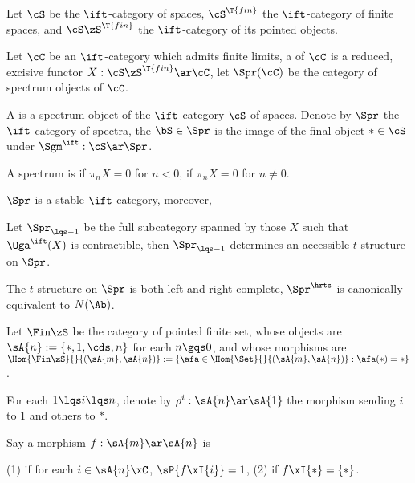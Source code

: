 \documentclass[article, a4paper, twoside]{universal}
\begin{document}
\begin{dfn}[1.4.2.5, 1.4.2.8, 1.4.3.1, 1.4.4.5]
    Let $\cS$ be the $\ift$-category of spaces, $\cS^{\T{fin}}$ the $\ift$-category of finite spaces, and $\cS\zS^{\T{fin}}$ the $\ift$-category of its pointed objects.

    Let $\cC$ be an $\ift$-category which admits finite limits, a  of $\cC$ is a reduced, excisive functor $X:\cS\zS^{\T{fin}}\ar\cC$, let $\Spr(\cC)$ be the category of spectrum objects of $\cC$.

    A  is a spectrum object of the $\ift$-category $\cS$ of spaces. Denote by $\Spr$ the $\ift$-category of spectra, the  $\bS\in\Spr$ is the image of the final object $*\in\cS$ under $\Sgm^{\ift}:\cS\ar\Spr$.

    A spectrum is  if $\pi_{n}X=0$ for $n<0$,  if $\pi_{n}X=0$ for $n\neq0$.
\end{dfn}


\begin{thm}[1.4.3.6]
    $\Spr$ is a stable $\ift$-category, moreover,
    \begin{enr}[label=(\arabic*)]
        \item Let $\Spr_{\lqs-1}$ be the full subcategory spanned by those $X$ such that $\Oga^{\ift}(X)$ is contractible, then $\Spr_{\lqs-1}$ determines an accessible $t$-structure on $\Spr$.
        \item The $t$-structure on $\Spr$ is both left and right complete, $\Spr^{\hrts}$ is canonically equivalent to $N(\Ab)$.
    \end{enr}
\end{thm}


\begin{dfn}[2.0.0.2]
    Let $\Fin\zS$ be the category of pointed finite set, whose objects are $\sA{n}:=\{*,1,\cds,n\}$ for each $n\gqs0$, and whose morphisms are $\Hom{\Fin\zS}{}{(\sA{m},\sA{n})}:=\{\afa\in\Hom{\Set}{}{(\sA{m},\sA{n})}:\afa(*)=*\}$.

    For each $1\lqs i\lqs n$, denote by $\rho^{i}:\sA{n}\ar\sA{1}$ the morphism sending $i$ to $1$ and others to $*$.
\end{dfn}

\begin{dfn}[2.1.1.8, 2.1.2.1]
    Say a morphism $f:\sA{m}\ar\sA{n}$ is

    (1)  if for each $i\in\sA{n}\xC$, $\sP{f\xI\{i\}}=1$, (2)  if $f\xI\{*\}=\{*\}$.
\end{dfn}
\end{document}
